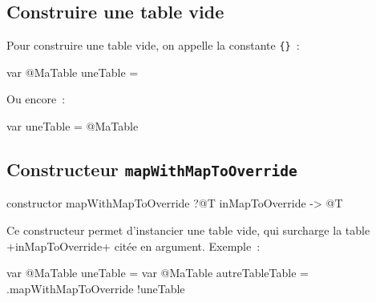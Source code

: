 \subsection{Construire une table vide}

Pour construire une table vide, on appelle  la constante \texttt{\{\}}~:
\begin{galgas}
var @MaTable uneTable = {}
\end{galgas}

Ou encore~:

\begin{galgas}
var uneTable = @MaTable {}
\end{galgas}

%
%
%

 

%
%
%
%

 

\subsection{Constructeur \texttt{mapWithMapToOverride}}

\begin{galgas}
constructor mapWithMapToOverride ?@T inMapToOverride -> @T
\end{galgas}

Ce constructeur permet d'instancier une table vide, qui surcharge la table \ggs+inMapToOverride+ citée en argument. Exemple~:
\begin{galgas}
var @MaTable uneTable = {}
var @MaTable autreTableTable = .mapWithMapToOverride {!uneTable}
\end{galgas}






